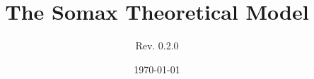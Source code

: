 \documentclass[10pt]{article}
\title{The Somax Theoretical Model}
\author{Rev. 0.2.0}
\date{\today}
\begin{document}
\maketitle








{}

\end{document}
